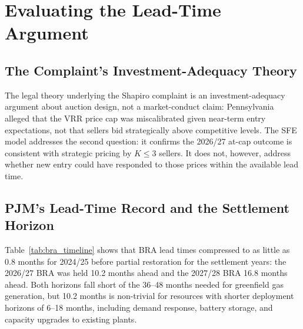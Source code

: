 
\section{Evaluating the Lead-Time Argument}
\label{sec:leadtime}

\subsection{The Complaint's Investment-Adequacy Theory}
\label{subsec:lt_theory}

The legal theory underlying the Shapiro complaint is an investment-adequacy
argument about auction design, not a market-conduct claim: Pennsylvania
alleged that the VRR price cap was miscalibrated given near-term entry
expectations, not that sellers bid strategically above competitive levels.
The SFE model addresses the second question: it confirms the 2026/27 at-cap
outcome is consistent with strategic pricing by $K \leq 3$ sellers. It does
not, however, address whether new entry could have responded to those prices
within the available lead time.

\subsection{PJM's Lead-Time Record and the Settlement Horizon}
\label{subsec:lt_record}

Table~\ref{tab:bra_timeline} shows that BRA lead times compressed to as
little as 0.8 months for 2024/25 before partial restoration for the
settlement years: the 2026/27 BRA was held 10.2 months ahead and the
2027/28 BRA 16.8 months ahead. Both
horizons fall short of the 36--48 months needed for greenfield gas
generation, but 10.2 months is non-trivial for resources with shorter
deployment horizons of 6--18 months, including demand response, battery storage,
and capacity upgrades to existing plants.

